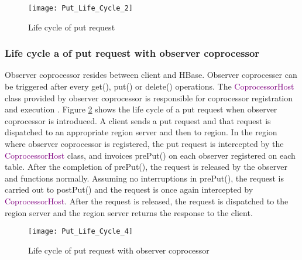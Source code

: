 \documentclass[11pt,a4paper,bibtotoc,idxtotoc,headsepline,footsepline,footexclude,BCOR12mm,DIV13]{scrbook}
\begin{document}
\begin{figure}[h!]
	\centering
	\texttt{[image: Put\_Life\_Cycle\_2]}
	\caption{Life cycle of put request}
	\label{Life cycle of put request}
	
\end{figure}


\subsubsection{Life cycle a of put request with observer coprocessor}
\label{subsubsec:Life cycle of put request with observer coprocessor}

Observer coprocessor resides between client and HBase. Observer coprocesser can be triggered after every get(), put() or delete() operations. The \textcolor{purple} {CoprocessorHost} class provided by observer coprocessor is responsible for coprocessor registration and execution \cite{coprocessor:detail}. Figure \ref{Life cycle of put request with observer coprocessor} shows the life cycle of a put request when observer coprocessor is introduced. A client sends a put request and that request is dispatched to an appropriate region server and then to region. In the region where observer coprocessor is registered, the put request is intercepted by the \textcolor{purple} {CoprocessorHost} class, and invoices prePut() on each observer registered on each table. After the completion of prePut(), the request is released by the observer and functions normally. Assuming no interruptions in prePut(), the request is carried out to postPut() and the request is once again intercepted by \textcolor{purple} {CoprocessorHost}. After the request is released, the request is dispatched to the region server and the region server returns the response to the client.
\newline \newline

\begin{figure}[h!]
	\centering
	\texttt{[image: Put\_Life\_Cycle\_4]}
	\caption{Life cycle of put request with observer coprocessor}
	\label{Life cycle of put request with observer coprocessor}
	
\end{figure}


%	
%
%    
\end{document}
